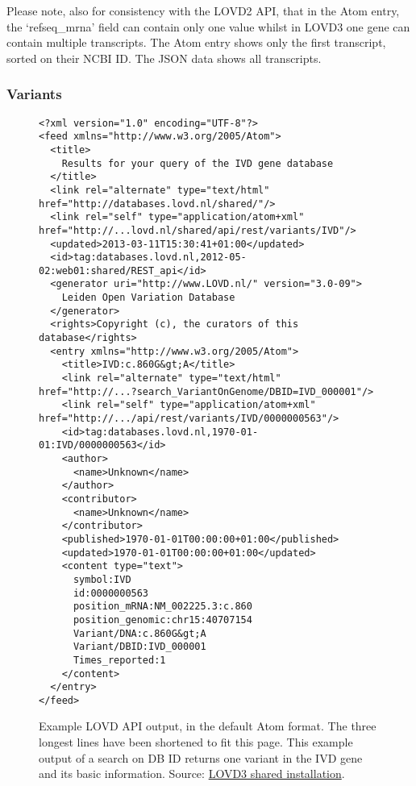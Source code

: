 Please note, also for consistency with the LOVD2 API, that in the Atom entry, the `refseq\_mrna' field can
 contain only one value whilst in LOVD3 one gene can contain multiple transcripts.
The Atom entry shows only the first transcript, sorted on their NCBI ID.
The JSON data shows all transcripts.
\clearpage

\subsubsection{Variants}
\begin{figure}[ht]
  \begin{shaded}
    \scriptsize
    \begin{verbatim}
<?xml version="1.0" encoding="UTF-8"?>
<feed xmlns="http://www.w3.org/2005/Atom">
  <title>
    Results for your query of the IVD gene database
  </title>
  <link rel="alternate" type="text/html" href="http://databases.lovd.nl/shared/"/>
  <link rel="self" type="application/atom+xml" href="http://...lovd.nl/shared/api/rest/variants/IVD"/>
  <updated>2013-03-11T15:30:41+01:00</updated>
  <id>tag:databases.lovd.nl,2012-05-02:web01:shared/REST_api</id>
  <generator uri="http://www.LOVD.nl/" version="3.0-09">
    Leiden Open Variation Database
  </generator>
  <rights>Copyright (c), the curators of this database</rights>
  <entry xmlns="http://www.w3.org/2005/Atom">
    <title>IVD:c.860G&gt;A</title>
    <link rel="alternate" type="text/html" href="http://...?search_VariantOnGenome/DBID=IVD_000001"/>
    <link rel="self" type="application/atom+xml" href="http://.../api/rest/variants/IVD/0000000563"/>
    <id>tag:databases.lovd.nl,1970-01-01:IVD/0000000563</id>
    <author>
      <name>Unknown</name>
    </author>
    <contributor>
      <name>Unknown</name>
    </contributor>
    <published>1970-01-01T00:00:00+01:00</published>
    <updated>1970-01-01T00:00:00+01:00</updated>
    <content type="text">
      symbol:IVD
      id:0000000563
      position_mRNA:NM_002225.3:c.860
      position_genomic:chr15:40707154
      Variant/DNA:c.860G&gt;A
      Variant/DBID:IVD_000001
      Times_reported:1
    </content>
  </entry>
</feed>
    \end{verbatim}
  \caption{%
    Example LOVD API output, in the default Atom format.
    The three longest lines have been shortened to fit this page.
    This example output of a search on DB ID returns one variant in the IVD gene and its basic information.
    Source: \href{http://databases.lovd.nl/shared/api/rest/variants/IVD?search_Variant/DBID=IVD_000001}
     {LOVD3 shared installation}.}
  \end{shaded}
\end{figure}

